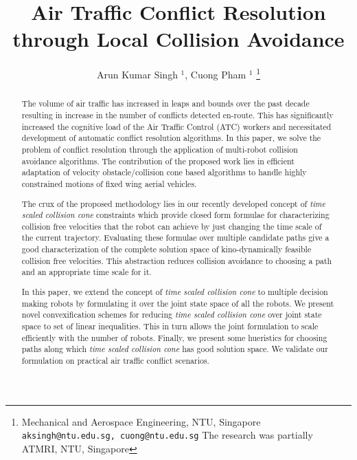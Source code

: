 \documentclass[letterpaper, 10 pt, conference]{IEEEtran}  %
\title{\LARGE \bf
Air Traffic Conflict Resolution through Local Collision Avoidance 
}
\author{Arun Kumar Singh $^1$, Cuong Pham $^1$%
\thanks{Mechanical and Aerospace Engineering, NTU, Singapore     
        {\tt\small
 aksingh@ntu.edu.sg,   cuong@ntu.edu.sg}
The research was partially ATMRI, NTU, Singapore}
}
\begin{document}
\maketitle
\thispagestyle{empty}
\pagestyle{empty}


\begin{abstract}

The volume of air traffic has increased in leaps and bounds over the past decade resulting in increase in the number of conflicts detected en-route. This has significantly increased the cognitive load of the Air Traffic Control (ATC) workers and necessitated development of automatic conflict resolution algorithms. In this paper, we solve the problem of conflict resolution through the application of multi-robot collision avoidance algorithms. The contribution of the proposed work lies in efficient adaptation of velocity obstacle/collision cone based  algorithms to handle highly constrained motions of fixed wing aerial vehicles. 

The crux of the proposed methodology lies in our recently developed  concept of \emph{time scaled collision cone} constraints which provide closed form formulae for characterizing collision free velocities that the robot can achieve by just changing the time scale of the current trajectory. Evaluating these formulae over multiple candidate paths give a good characterization of the complete solution space of kino-dynamically feasible collision free velocities. This abstraction reduces collision avoidance to choosing a path and an appropriate time scale for it. 

In this paper, we extend the concept of \emph{time scaled collision cone} to multiple decision making robots by formulating it over the joint state space of all the robots. We present novel convexification schemes for reducing \emph{time scaled collision cone} over joint state space to set of linear inequalities. This in turn allows the joint formulation to scale efficiently with the number of robots. Finally, we present some hueristics for choosing paths along which \emph{time scaled collision cone} has good solution space. We validate our formulation on practical air traffic conflict scenarios.

 




















\end{abstract}
\end{document}
